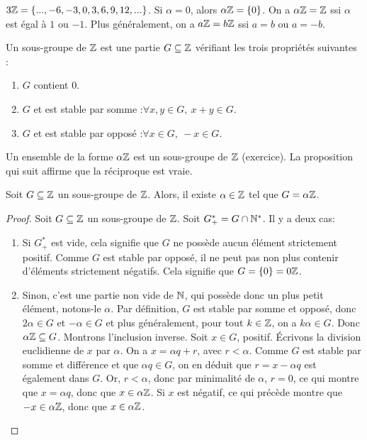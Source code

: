 \begin{exemple}
$3\mathbb{Z} = \{...,-6,-3,0,3,6,9,12,...\}$. Si $\alpha=0$, alors $\alpha\mathbb{Z} = \{0\}$. On a $\alpha\mathbb{Z} = \mathbb{Z}$ ssi $\alpha$ est égal à $1$ ou $-1$. Plus généralement, on a $a\mathbb{Z}=b\mathbb{Z}$ ssi $a=b$ ou $a=-b$.
\end{exemple}


\begin{definition}
Un sous-groupe de $\mathbb{Z}$ est une partie $G \subseteq \mathbb{Z}$ vérifiant les trois propriétés suivantes : 
\begin{enumerate}
\item $G$ contient $0$.
\item $G$ et est stable par somme :$\forall x, y\in G, \: x+y \in G$.
\item $G$ et est stable par opposé :$\forall x\in G, \: -x \in G$.
\end{enumerate}
\end{definition}

Un ensemble de la forme $\alpha\mathbb{Z}$ est un sous-groupe de $\mathbb{Z}$ (exercice). La proposition qui suit affirme que la réciproque est vraie.

\begin{proposition}
Soit $G\subseteq \mathbb{Z}$ un sous-groupe de $\mathbb{Z}$. Alors, il existe $\alpha \in \mathbb{Z}$ tel que $G = \alpha\mathbb{Z}$. 
\end{proposition}


\begin{proof}
Soit $G \subseteq \mathbb{Z}$ un sous-groupe de $\mathbb{Z}$. Soit $G^*_+ = G \cap \mathbb{N}^*$. Il y a deux cas:
\begin{enumerate}
\item Si $G^*_+$ est vide, cela signifie que $G$ ne possède aucun élément strictement positif. Comme $G$ est stable par opposé, il ne peut pas non plus contenir d'éléments strictement négatifs. Cela signifie que $G=\{0\} = 0\mathbb{Z}$.
\item Sinon, c'est une partie non vide de $\mathbb{N}$, qui possède donc un plus petit élément, notons-le $\alpha$.
Par définition, $G$ est stable par somme et opposé, donc $2\alpha\in G$ et $-\alpha \in G$ et plus généralement, pour tout $k\in \mathbb{Z}$, on a $k\alpha \in G$.
Donc $\alpha\mathbb{Z} \subseteq G$. Montrons l'inclusion inverse.
Soit $x\in G$, positif. \'Ecrivons la division euclidienne de $x$ par $\alpha$. On a $x = \alpha q + r$, avec $r<\alpha$. Comme $G$ est stable par somme et différence et que $\alpha q \in G$, on en déduit que $r = x-\alpha q$ est également dans $G$. Or, $r<\alpha$, donc par minimalité de $\alpha$, $r=0$, ce qui montre que $x = \alpha q$, donc que $x\in \alpha\mathbb{Z}$.
Si $x$ est négatif, ce qui précède montre que $-x\in \alpha\mathbb{Z}$, donc que $x\in \alpha\mathbb{Z}$.
\end{enumerate}
\end{proof}

